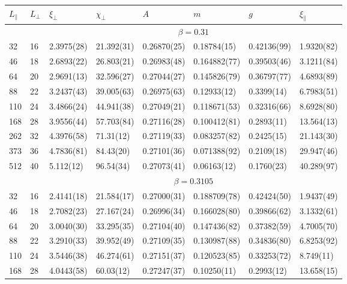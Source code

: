 \documentclass[12pt]{article}
\begin{document}
\begin{table}
\tiny  \centering

\begin{tabular}{llllllll}
 \hline 
 \hfil $L_{\|}$ \hfil & \hfil $L_\bot$ \hfil &  \hfil $\xi_\bot$ \hfil & 
 \hfil $\chi_\bot$ \hfil & \hfil $A$ \hfil & \hfil $m$ \hfil & 
 \hfil $g$ \hfil & \hfil $\xi_{\|}$ \hfil  \\ 
\hline 
  & & \multicolumn{6}{c}{$ \beta = 0.31 $} \\ 
 \hline 
32 & 16 & 2.3975(28) & 21.392(31) & 0.26870(25) & 0.18784(15) & 0.42136(99) & 1.9320(82)\\ 
46 & 18 & 2.6893(22) & 26.803(21) & 0.26983(48) & 0.164882(77) & 0.39503(46) & 3.1211(84)\\ 
64 & 20 & 2.9691(13) & 32.596(27) & 0.27044(27) & 0.145826(79) & 0.36797(77) & 4.6893(89)\\ 
88 & 22 & 3.2437(43) & 39.005(63) & 0.26975(63) & 0.12933(12) & 0.3399(14) & 6.7983(51)\\ 
110 & 24 & 3.4866(24) & 44.941(38) & 0.27049(21) & 0.118671(53) & 0.32316(66) & 8.6928(80)\\ 
168 & 28 & 3.9556(44) & 57.703(84) & 0.27116(28) & 0.100412(81) & 0.2893(11) & 13.564(13)\\ 
262 & 32 & 4.3976(58) & 71.31(12) & 0.27119(33) & 0.083257(82) & 0.2425(15) & 21.143(30)\\ 
373 & 36 & 4.7836(81) & 84.43(20) & 0.27101(36) & 0.071388(92) & 0.2109(18) & 29.947(46)\\ 
512 & 40 & 5.112(12) & 96.54(34) & 0.27073(41) & 0.06163(12) & 0.1760(23) & 40.289(97)\\ 
\hline 
  & & \multicolumn{6}{c}{$ \beta = 0.3105 $} \\ 
 \hline 
32 & 16 & 2.4141(18) & 21.584(17) & 0.27000(31) & 0.188709(78) & 0.42424(50) & 1.9437(49)\\ 
46 & 18 & 2.7082(23) & 27.167(24) & 0.26996(34) & 0.166028(80) & 0.39866(62) & 3.1332(61)\\ 
64 & 20 & 3.0040(30) & 33.295(35) & 0.27104(40) & 0.147436(82) & 0.37382(59) & 4.7005(70)\\ 
88 & 22 & 3.2910(33) & 39.952(49) & 0.27109(35) & 0.130987(88) & 0.34836(80) & 6.8253(92)\\ 
110 & 24 & 3.5446(38) & 46.274(61) & 0.27151(37) & 0.120523(85) & 0.33253(72) & 8.749(11)\\ 
168 & 28 & 4.0443(58) & 60.03(12) & 0.27247(37) & 0.10250(11) & 0.2993(12) & 13.658(15)\\ 

\end{tabular}
\end{table}
\end{document}
